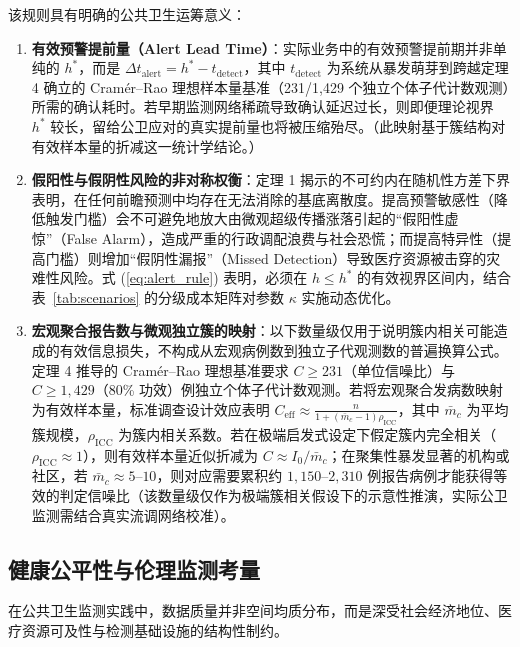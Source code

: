 \documentclass[11pt,a4paper]{article}
\theoremstyle{plain}
\theoremstyle{definition}
\begin{document}
该规则具有明确的公共卫生运筹意义：
\begin{enumerate}
\item \textbf{有效预警提前量（Alert Lead Time）}：实际业务中的有效预警提前期并非单纯的 $h^*$，而是 $\Delta t_{\text{alert}} = h^* - t_{\text{detect}}$，其中 $t_{\text{detect}}$ 为系统从暴发萌芽到跨越定理 4 确立的 Cram\'er--Rao 理想样本量基准（231/1,429 个独立个体子代计数观测）所需的确认耗时。若早期监测网络稀疏导致确认延迟过长，则即便理论视界 $h^*$ 较长，留给公卫应对的真实提前量也将被压缩殆尽。（此映射基于簇结构对有效样本量的折减这一统计学结论。）
\item \textbf{假阳性与假阴性风险的非对称权衡}：定理 1 揭示的不可约内在随机性方差下界表明，在任何前瞻预测中均存在无法消除的基底离散度。提高预警敏感性（降低触发门槛）会不可避免地放大由微观超级传播涨落引起的“假阳性虚惊”（False Alarm），造成严重的行政调配浪费与社会恐慌；而提高特异性（提高门槛）则增加“假阴性漏报”（Missed Detection）导致医疗资源被击穿的灾难性风险。式 (\ref{eq:alert_rule}) 表明，必须在 $h \le h^*$ 的有效视界区间内，结合表~\ref{tab:scenarios} 的分级成本矩阵对参数 $\kappa$ 实施动态优化。
\item \textbf{宏观聚合报告数与微观独立簇的映射}：以下数量级仅用于说明簇内相关可能造成的有效信息损失，不构成从宏观病例数到独立子代观测数的普遍换算公式。定理 4 推导的 Cram\'er--Rao 理想基准要求 $C \ge 231$（单位信噪比）与 $C \ge 1{,}429$（80\% 功效）例独立个体子代计数观测。若将宏观聚合发病数映射为有效样本量，标准调查设计效应表明 $C_{\text{eff}} \approx \frac{n}{1 + (\bar{m}_c - 1)\rho_{\text{ICC}}}$，其中 $\bar{m}_c$ 为平均簇规模，$\rho_{\text{ICC}}$ 为簇内相关系数。若在极端启发式设定下假定簇内完全相关（$\rho_{\text{ICC}} \approx 1$），则有效样本量近似折减为 $C \approx I_0 / \bar{m}_c$；在聚集性暴发显著的机构或社区，若 $\bar{m}_c \approx 5\text{--}10$，则对应需要累积约 $1{,}150\text{--}2{,}310$ 例报告病例才能获得等效的判定信噪比（该数量级仅作为极端簇相关假设下的示意性推演，实际公卫监测需结合真实流调网络校准）。
\end{enumerate}

\subsection{健康公平性与伦理监测考量}

在公共卫生监测实践中，数据质量并非空间均质分布，而是深受社会经济地位、医疗资源可及性与检测基础设施的结构性制约。
\end{document}

